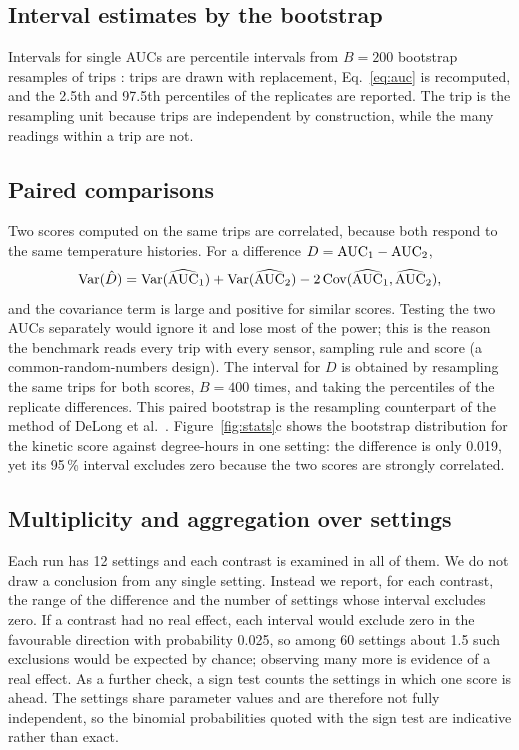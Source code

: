\subsection{Interval estimates by the bootstrap}
Intervals for single AUCs are percentile intervals from $B=200$ bootstrap resamples of trips \cite{efron1993}: trips are drawn with replacement, Eq.~\eqref{eq:auc} is recomputed, and the 2.5th and 97.5th percentiles of the replicates are reported. The trip is the resampling unit because trips are independent by construction, while the many readings within a trip are not.

\subsection{Paired comparisons}
Two scores computed on the same trips are correlated, because both respond to the same temperature histories. For a difference $D=\mathrm{AUC}_1-\mathrm{AUC}_2$,
\begin{equation}\label{eq:vard}
\mathrm{Var}(\hat D)=\mathrm{Var}(\widehat{\mathrm{AUC}}_1)+\mathrm{Var}(\widehat{\mathrm{AUC}}_2)-2\,\mathrm{Cov}(\widehat{\mathrm{AUC}}_1,\widehat{\mathrm{AUC}}_2),
\end{equation}
and the covariance term is large and positive for similar scores. Testing the two AUCs separately would ignore it and lose most of the power; this is the reason the benchmark reads every trip with every sensor, sampling rule and score (a common-random-numbers design). The interval for $D$ is obtained by resampling the same trips for both scores, $B=400$ times, and taking the percentiles of the replicate differences. This paired bootstrap is the resampling counterpart of the method of DeLong et al.\ \cite{delong1988}. Figure~\ref{fig:stats}c shows the bootstrap distribution for the kinetic score against degree-hours in one setting: the difference is only 0.019, yet its 95\,\% interval excludes zero because the two scores are strongly correlated.

\subsection{Multiplicity and aggregation over settings}
Each run has 12 settings and each contrast is examined in all of them. We do not draw a conclusion from any single setting. Instead we report, for each contrast, the range of the difference and the number of settings whose interval excludes zero. If a contrast had no real effect, each interval would exclude zero in the favourable direction with probability 0.025, so among 60 settings about 1.5 such exclusions would be expected by chance; observing many more is evidence of a real effect. As a further check, a sign test counts the settings in which one score is ahead. The settings share parameter values and are therefore not fully independent, so the binomial probabilities quoted with the sign test are indicative rather than exact.

